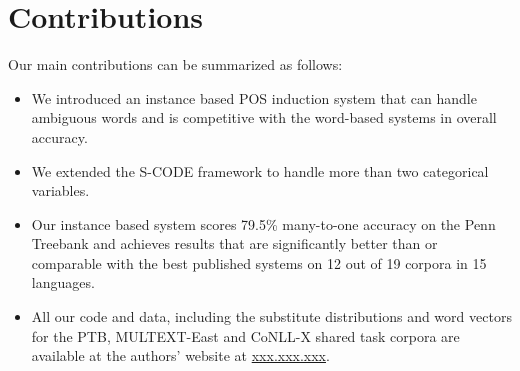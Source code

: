 \section{Contributions}
\label{sec:contrib}
Our main contributions can be summarized as follows:
\begin{itemize}
\item We introduced an instance based POS induction system that can
  handle ambiguous words and is competitive with the word-based systems in
  overall accuracy.  
\item We extended the S-CODE framework to handle more than two categorical
  variables. 
\item Our instance based system scores 79.5\% many-to-one accuracy on
  the Penn Treebank and achieves results that are significantly better
  than or comparable with the best published systems on 12 out of 19
  corpora in 15 languages.
\item All our code and data, including the substitute distributions
  and word vectors for the PTB, MULTEXT-East and CoNLL-X shared task
  corpora are available at the authors' website at
  \mbox{\url{xxx.xxx.xxx}}.
\end{itemize}

